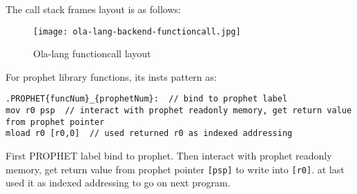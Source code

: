 The call stack frames layout is as follows:

\begin{figure}[!htp]
    \centering
    \texttt{[image: ola-lang-backend-functioncall.jpg]}
    \caption{Ola-lang functioncall layout}
    \label{fig:ola-lang-backend-functioncall}
\end{figure}

For prophet library functions, its insts pattern as:
\begin{lstlisting}[language={}]
.PROPHET{funcNum}_{prophetNum}:  // bind to prophet label
mov r0 psp  // interact with prophet readonly memory, get return value from prophet pointer
mload r0 [r0,0]  // used returned r0 as indexed addressing
\end{lstlisting}

First PROPHET label bind to prophet. Then interact with prophet readonly memory, get return value from prophet pointer \texttt{[psp]} to write into \texttt{[r0]}.
at last used it as indexed addressing to go on next program.